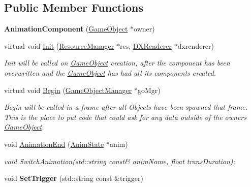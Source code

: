 \subsection*{Public Member Functions}
\begin{DoxyCompactItemize}
\item 
\mbox{\label{classAnimationComponent_a2759aea8d6d3e70f7b4f0f91eb68dbf2}} 
{\bfseries Animation\+Component} (\hyperlink{classGameObject}{Game\+Object} $\ast$owner)
\item 
virtual void \hyperlink{classAnimationComponent_a7847ca35ed87a7d2156081ad41822de4}{Init} (\hyperlink{classResourceManager}{Resource\+Manager} $\ast$res, \hyperlink{classDXRenderer}{D\+X\+Renderer} $\ast$dxrenderer)
\begin{DoxyCompactList}\small\item\em Init will be called on \hyperlink{classGameObject}{Game\+Object} creation, after the component has been overwritten and the \hyperlink{classGameObject}{Game\+Object} has had all its components created. \end{DoxyCompactList}\item 
virtual void \hyperlink{classAnimationComponent_ab079696aad04351fa60a12040aeffe58}{Begin} (\hyperlink{classGameObjectManager}{Game\+Object\+Manager} $\ast$go\+Mgr)
\begin{DoxyCompactList}\small\item\em Begin will be called in a frame after all Objects have been spawned that frame. This is the place to put code that could ask for any data outside of the owner\textquotesingle{}s \hyperlink{classGameObject}{Game\+Object}. \end{DoxyCompactList}\item 
void \hyperlink{classAnimationComponent_a03636b1eaab7e1a4aaf05d6321ad2478}{Animation\+End} (\hyperlink{structAnimState}{Anim\+State} $\ast$anim)
\begin{DoxyCompactList}\small\item\em void Switch\+Animation(std\+::string const\& anim\+Name, float trans\+Duration); \end{DoxyCompactList}\item 
\mbox{\label{classAnimationComponent_af826696c15c75e727360009e1ebd4d8d}} 
void {\bfseries Set\+Trigger} (std\+::string const \&trigger)
\item 
\mbox{\label{classAnimationComponent_afd02daaa324cf1a038aed3736c579f81}} 

\end{DoxyCompactItemize}
